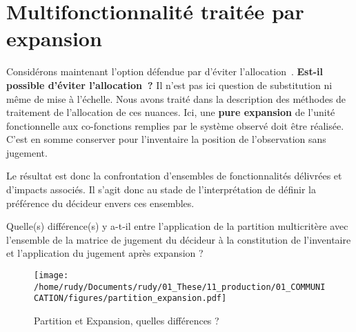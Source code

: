 \section{Multifonctionnalité traitée par expansion}

Considérons maintenant l'option défendue par \citeauthor{weidema_avoiding_2010} d'éviter l'allocation~\cite{weidema_avoiding_2010,weidema_avoiding_2000}. \textbf{Est-il possible d'éviter l'allocation~?}
Il n'est pas ici question de substitution ni même de mise à l'échelle.
Nous avons traité dans la description des méthodes de traitement de l'allocation de ces nuances.
Ici, une \textbf{pure expansion} de l'unité fonctionnelle aux co-fonctions remplies par le système observé doit être réalisée.
C'est en somme conserver pour l'inventaire la position de l'observation sans jugement.

Le résultat est donc la confrontation d'ensembles de fonctionnalités délivrées et d'impacts associés.
Il s'agit donc au stade de l'interprétation de définir la préférence du décideur envers ces ensembles.

Quelle(s) différence(s) y a-t-il entre l'application de la partition multicritère avec l'ensemble de la matrice de jugement du décideur à la constitution de l'inventaire et l'application du jugement après expansion ?


\begin{figure}
\centering
\texttt{[image: /home/rudy/Documents/rudy/01\_These/11\_production/01\_COMMUNICATION/figures/partition\_expansion.pdf]}
\caption{Partition et Expansion, quelles différences ?}
\label{fig:partition_expansion}
\end{figure}

